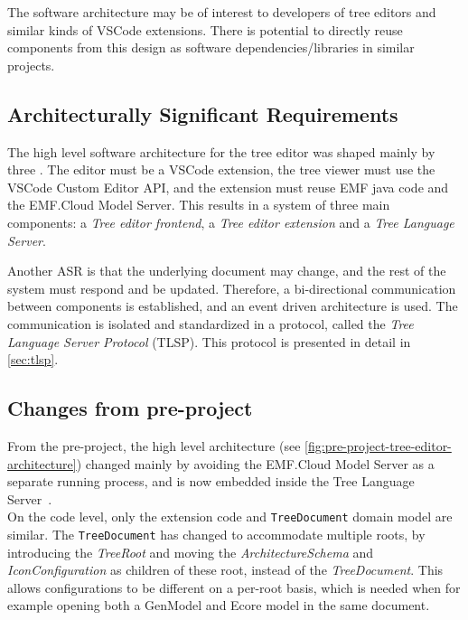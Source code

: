 The software architecture may be of interest to developers of tree editors and similar kinds of \gls{VSCode} extensions.
There is potential to directly reuse components from this design as software dependencies/libraries in similar projects.

\subsection{Architecturally Significant Requirements}
The high level software architecture for the tree editor was shaped mainly by three .
The editor must be a \gls{VSCode} extension, the tree viewer must use the \gls{VSCode} Custom Editor \gls{API}, and the extension must reuse \acrshort{EMF} java code and the EMF.Cloud Model Server.
This results in a system of three main components: a \textit{Tree editor frontend}, a \textit{Tree editor extension} and a \textit{Tree Language Server}.

Another \acrshort{ASR} is that the underlying document may change, and the rest of the system must respond and be updated.
Therefore, a bi-directional communication between components is established, and an event driven architecture is used.
The communication is isolated and standardized in a protocol, called the \textit{Tree Language Server Protocol} (\acrshort{TLSP}).
This protocol is presented in detail in \cref{sec:tlsp}.


\subsection{Changes from pre-project}
From the pre-project, the high level architecture (see \cref{fig:pre-project-tree-editor-architecture}) changed mainly by avoiding the EMF.Cloud Model Server as a separate running process, and is now embedded inside the Tree Language Server~\cite[p.~49]{rekstadModelingEnvironmentCloud2020}.\\

On the code level, only the extension code and \texttt{TreeDocument} domain model are similar.
The \texttt{TreeDocument} has changed to accommodate multiple roots, by introducing the \textit{TreeRoot} and moving the \textit{ArchitectureSchema} and \textit{IconConfiguration} as children of these root, instead of the \textit{TreeDocument}.
This allows configurations to be different on a per-root basis, which is needed when for example opening both a GenModel and \gls{Ecore} model in the same document.\\

